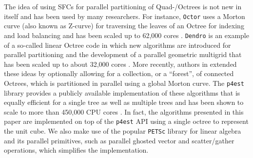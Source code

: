 The idea of using SFCs for parallel partitioning of Quad-/Octrees is not new in itself and has been used by many researchers. For instance, \texttt{Octor} \cite{Tu;OHallaron;Ghattas:05:Scalable-parallel-oc} uses a Morton curve (also known as Z-curve) for traversing the leaves of an Octree for indexing and load balancing and has been scaled up to 62,000 cores \cite{Burstedde;Ghattas;Gurnis;etal:08:Scalable-adaptive-ma}.
\texttt{Dendro} \cite{Sampath;Adavani;Sundar;etal:08:Dendro:-parallel-alg} is
an example of a so-called linear Octree code in which new algorithms are
introduced for parallel partitioning and the development of a parallel
geometric multigrid that has been scaled up to about 32,000 cores
\cite{Sampath;Biros:10:A-parallel-geometric}.
More recently, authors in
\cite{Burstedde;Wilcox;Ghattas:11:p4est:-Scalable-Algo} extended these ideas by
optionally allowing for a collection, or a ``forest'', of connected Octrees,
which is partitioned in parallel using a global Morton curve.
%
%
%
The \texttt{p4est} library \cite{p4est-github} provides a publicly available
implementation of these algorithms that is equally efficient for a single tree
as well as multiple trees and has been shown to scale to more than
450,000 CPU cores \cite{IsaacBursteddeWilcoxEtAl15}.
In fact, the algorithms presented in this paper are implemented on top of
the \texttt{p4est} API using a single octree to represent the unit cube.
%
We also make use of the popular \texttt{PETSc}
\cite{Balay;Abhyankar;Adams;etal:14:PETSc-Web-page} library for linear algebra
and its parallel primitives, such as parallel ghosted vector and scatter/gather
operations, which simplifies the implementation.

